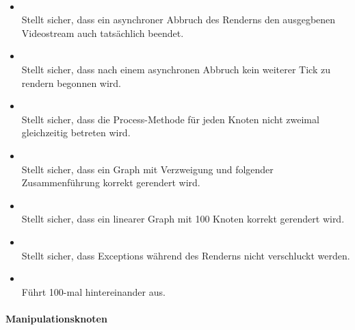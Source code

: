\paragraph{}
\begin{itemize}
	\item {} \\
	Stellt sicher, dass ein asynchroner Abbruch des Renderns den ausgegbenen Videostream auch tatsächlich beendet.
    \item {} \\
    Stellt sicher, dass nach einem asynchronen Abbruch kein weiterer Tick zu rendern begonnen wird.
    \item {} \\
    Stellt sicher, dass die Process-Methode für jeden Knoten nicht zweimal gleichzeitig betreten wird.
    \item {} \\
    Stellt sicher, dass ein Graph mit Verzweigung und folgender Zusammenführung korrekt gerendert wird.
    \item {} \\
    Stellt sicher, dass ein linearer Graph mit 100 Knoten korrekt gerendert wird.
    \item {} \\
    Stellt sicher, dass Exceptions während des Renderns nicht verschluckt werden.
    \item {} \\
    Führt  100-mal hintereinander aus.
\end{itemize}

\paragraph{Manipulationsknoten}

